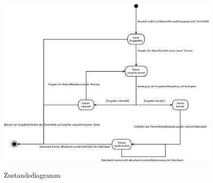 \documentclass[a4paper]{article}
\begin{document}
	\begin{figure}
		\centering
		\caption{Zustandsdiagramm}
		\includegraphics[width=1.0\linewidth]{Zustandsdiagramm}
		\label{fig:Zustandsdiagramm}
	\end{figure}
\end{document}

